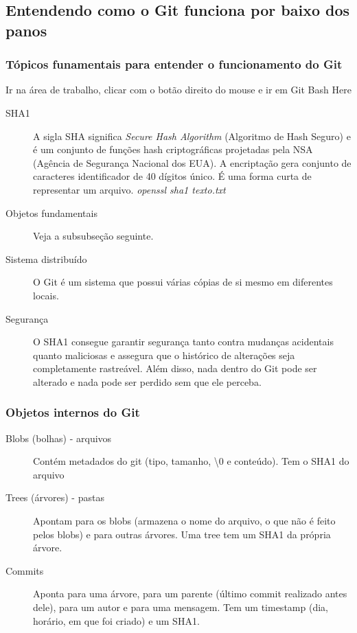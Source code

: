 \documentclass[12pt,a4paper]{article}
\begin{document}
	\subsection{Entendendo como o Git funciona por baixo dos panos}
	
	\subsubsection{Tópicos funamentais para entender o funcionamento do Git}
	
	Ir na área de trabalho, clicar com o botão direito do mouse e ir em Git Bash Here
	
	\begin{description}
		\item[SHA1] A sigla SHA significa \textit{Secure Hash Algorithm} (Algoritmo de Hash Seguro) e é um conjunto de funções hash criptográficas projetadas pela NSA (Agência de Segurança Nacional dos EUA). A encriptação gera conjunto de caracteres identificador de 40 dígitos único. É uma forma curta de representar um arquivo. \textit{openssl sha1 texto.txt}
		
		\item[Objetos fundamentais] Veja a subsubseção seguinte.
		\item[Sistema distribuído] O Git é um sistema que possui várias cópias de si mesmo em diferentes locais.
		\item[Segurança] O SHA1 consegue garantir segurança tanto contra mudanças acidentais quanto maliciosas e assegura que o histórico de alterações seja completamente rastreável. Além disso, nada dentro do Git pode ser alterado e nada pode ser perdido sem que ele perceba.
	\end{description}
	
	\subsubsection{Objetos internos do Git}
	
	\begin{description}
		\item[Blobs (bolhas) - arquivos ] Contém metadados do git (tipo, tamanho, \textbackslash 0 e conteúdo). Tem o SHA1 do arquivo
		\item[Trees (árvores) - pastas] Apontam para os blobs (armazena o nome do arquivo, o que não é feito pelos blobs) e para outras árvores. Uma tree tem um SHA1 da própria árvore.
		\item[Commits] Aponta para uma árvore, para um parente (último commit realizado antes dele), para um autor e para uma mensagem. Tem um timestamp (dia, horário, em que foi criado) e um SHA1.
	\end{description}
	
\end{document}
